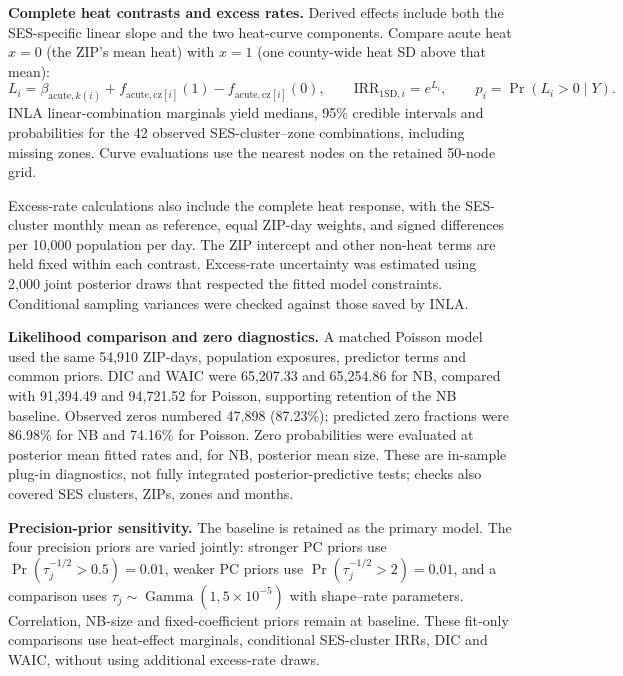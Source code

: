 \documentclass[10pt]{article}
\begin{document}
\textbf{Complete heat contrasts and excess rates.}
Derived effects include both the SES-specific linear slope and the two
heat-curve components. Compare acute heat $x=0$ (the ZIP's mean heat) with
$x=1$ (one county-wide heat SD above that mean):
\[
L_i=\beta_{\mathrm{acute},k(i)}
+f_{\mathrm{acute},\mathrm{cz}[i]}(1)
-f_{\mathrm{acute},\mathrm{cz}[i]}(0),\qquad
\mathrm{IRR}_{1\mathrm{SD},i}=e^{L_i},\qquad
p_i=\Pr(L_i>0\mid Y).
\]
INLA linear-combination marginals yield medians, 95\% credible intervals and
probabilities for the 42 observed SES-cluster--zone combinations, including missing zones.
Curve evaluations use the nearest nodes on the retained 50-node grid.

Excess-rate calculations also include the complete heat response, with the
SES-cluster monthly mean as reference, equal ZIP-day weights, and signed
differences per 10,000 population per day. The ZIP intercept and other
non-heat terms are held fixed within each contrast. Excess-rate uncertainty
was estimated using 2,000 joint posterior draws that respected the fitted
model constraints. Conditional sampling variances were checked against
those saved by INLA.

\textbf{Likelihood comparison and zero diagnostics.}
A matched Poisson model used the same 54,910 ZIP-days, population exposures,
predictor terms and common priors. DIC and WAIC were 65,207.33 and 65,254.86
for NB, compared with 91,394.49 and 94,721.52 for Poisson, supporting retention
of the NB baseline. Observed zeros numbered 47,898 (87.23\%); predicted zero
fractions were 86.98\% for NB and 74.16\% for Poisson. Zero probabilities
were evaluated at posterior mean fitted rates and, for NB, posterior mean
size. These are in-sample plug-in diagnostics, not fully integrated
posterior-predictive tests; checks also covered SES clusters, ZIPs, zones
and months.

\textbf{Precision-prior sensitivity.}
The baseline is retained as the primary model. The four precision priors
are varied jointly: stronger PC priors use
$\Pr(\tau_j^{-1/2}>0.5)=0.01$, weaker PC priors use
$\Pr(\tau_j^{-1/2}>2)=0.01$, and a comparison uses
$\tau_j\sim\operatorname{Gamma}(1,5\times10^{-5})$ with shape--rate
parameters. Correlation, NB-size and fixed-coefficient priors remain at
baseline. These fit-only comparisons use heat-effect marginals,
conditional SES-cluster IRRs, DIC and WAIC, without using additional
excess-rate draws.
\end{document}
